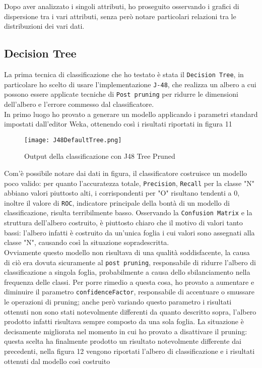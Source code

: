 Dopo aver analizzato i singoli attributi, ho proseguito osservando i grafici di dispersione tra i vari attributi, senza però notare particolari relazioni tra le distribuzioni dei vari dati.

  
  
  \subsection{Decision Tree}
  La prima tecnica di classificazione che ho testato è stata il \texttt{Decision Tree}, in particolare ho scelto di usare l'implementazione \texttt{J-48}, che realizza un albero a cui possono essere applicate tecniche di \texttt{Post pruning} per ridurre le dimensioni dell'albero e l'errore commesso dal classificatore.\\
  In primo luogo ho provato a generare un modello applicando i parametri standard impostati dall'editor Weka, ottenendo così i risultati riportati in figura 11
  
  \begin{figure}[H]
  	\texttt{[image: J48DefaultTree.png]}
  	\caption{Output della classificazione con J48 Tree Pruned}
  \end{figure}

Com'è possibile notare dai dati in figura, il classificatore costruisce un modello poco valido: per quanto l'accuratezza totale, \texttt{Precision}, \texttt{Recall} per la classe "N" abbiano valori piuttosto alti, i corrispondenti per "O" risultano tendenti a 0, inoltre il valore di \texttt{ROC}, indicatore principale della bontà di un modello di classificazione, risulta terribilmente basso. Osservando la \texttt{Confusion Matrix} e la struttura dell'albero costruito, è piuttosto chiaro che il motivo di valori tanto bassi: l'albero infatti è costruito da un'unica foglia i cui valori sono assegnati alla classe "N", causando così la situazione sopradescritta.\\
Ovviamente questo modello non risultava di una qualità soddisfacente, la causa di ciò era dovuta sicuramente al \texttt{post pruning}, responsabile di ridurre l'albero di classificazione a singola foglia,  probabilmente a causa dello sbilanciamento nella frequenza delle classi.
Per porre rimedio a questa cosa, ho provato a aumentare e diminuire il parametro \texttt{confidenceFactor}, responsabile di accentuare o smussare le operazioni di pruning; anche però variando questo parametro i risultati ottenuti non sono stati notevolmente differenti da quanto descritto sopra, l'albero prodotto infatti risultava sempre composto da una sola foglia.
La situazione è decisamente migliorata nel momento in cui ho provato a disattivare il pruning: questa scelta ha finalmente prodotto un risultato notevolmente differente dai precedenti, nella figura 12  vengono riportati l'albero di classificazione e i risultati ottenuti dal modello così costruito


